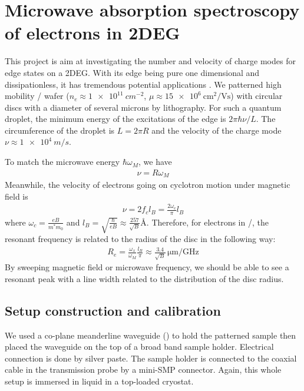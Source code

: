 \documentclass[12pt]{ruthesis}
\begin{document}
\chapter{Microwave absorption spectroscopy of electrons in 2DEG}\label{Absorption}

This project is aim at investigating the number and velocity of charge modes for edge states on a 2DEG.
With its edge being pure one dimensional and dissipationless, it has tremendous potential applications \cite{PhysRevB.88.165305}.
We patterned high mobility / wafer ($n_{e} \approx \SI{1e11}{cm^{-2}}$, $\mu \approx \SI{15 e6}{\cm^{2}/\volt \second}$) with circular discs with a diameter of several microns by lithography. 
For such a quantum droplet, the minimum energy of the excitations of the edge is $2\pi \hbar \nu /L$. 
The circumference of the droplet is $L=2\pi R$ and the velocity of the charge mode $\nu \approx \SI{1e4}{m/s}$.

To match the microwave energy $\hbar \omega_{M}$, we have 
\begin{align}
\nu = R \omega_{M}
\end{align}
Meanwhile, the velocity of electrons going on cyclotron motion under magnetic field is 
\begin{align}
\nu = 2 f_{c} l_{B}= \frac{2 \omega_{c}}{\pi} l_{B} 
\end{align}
where $\displaystyle \omega_{c}= \frac{eB}{m^{\ast}m_{0}}$ and $\displaystyle l_{B}=\sqrt{\frac{\hbar}{eB}} \approx \frac{257}{\sqrt{B}} \si{\angstrom}$.
Therefore, for electrons in /, the resonant frequency is related to the radius of the disc in the following way:
\begin{align}
R_{e}= \frac{\omega_{x}}{\omega_{M}} \frac{l_{B}}{\pi} \approx \frac{3.4}{\sqrt{B}} \, \si{\micro\meter/\giga\hertz}
\end{align}
By sweeping magnetic field or microwave frequency, we should be able to see a resonant peak with a line width related to the distribution of the disc radius. 


\section{Setup construction and calibration}\label{Construction}

We used a co-plane meanderline waveguide (\cite{APLBroadbandESR}) to hold the patterned sample then placed the waveguide on the top of a broad band sample holder.
Electrical connection is done by silver paste.  
The sample holder is connected to the coaxial cable in the transmission probe by a mini-SMP connector.
Again, this whole setup is immersed in  liquid in a top-loaded cryostat.
\end{document}
